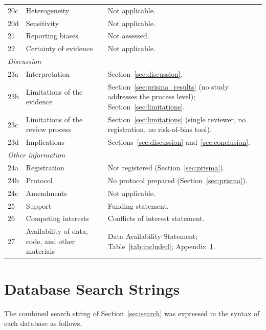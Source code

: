 \documentclass[journal,article,submit,pdftex,moreauthors]{Definitions/mdpi}
\begin{document}
{\begin{longtable}{p{0.7cm}p{3.0cm}p{8.3cm}}
20c & Heterogeneity & Not applicable. \\
20d & Sensitivity & Not applicable. \\
21 & Reporting biases & Not assessed. \\
22 & Certainty of evidence & Not applicable. \\
\multicolumn{3}{l}{\textit{Discussion}} \\
23a & Interpretation & Section~\ref{sec:discussion}. \\
23b & Limitations of the evidence & Section~\ref{sec:prisma_results} (no study addresses the process level); Section~\ref{sec:limitations}. \\
23c & Limitations of the review process & Section~\ref{sec:limitations} (single reviewer, no registration, no risk-of-bias tool). \\
23d & Implications & Sections~\ref{sec:discussion} and~\ref{sec:conclusion}. \\
\multicolumn{3}{l}{\textit{Other information}} \\
24a & Registration & Not registered (Section~\ref{sec:prisma}). \\
24b & Protocol & No protocol prepared (Section~\ref{sec:prisma}). \\
24c & Amendments & Not applicable. \\
25 & Support & Funding statement. \\
26 & Competing interests & Conflicts of interest statement. \\
27 & Availability of data, code, and other materials & Data Availability Statement; Table~\ref{tab:included}; Appendix~\ref{appendix:search}. \\
\end{longtable}
}

\section[\appendixname~\thesection]{Database Search Strings}
\label{appendix:search}

The combined search string of Section~\ref{sec:search} was expressed in the syntax of each database as follows.
\end{document}
